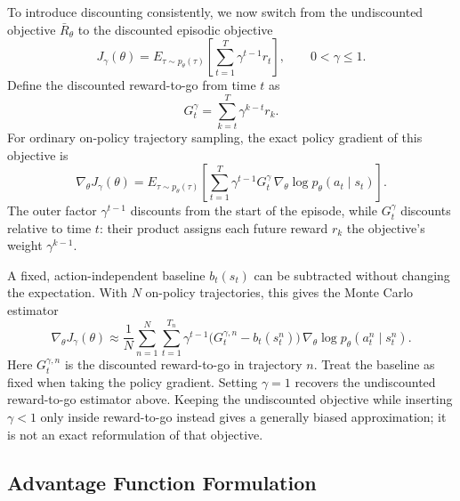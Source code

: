 \documentclass[11pt, a4paper]{article}
\begin{document}
To introduce discounting consistently, we now switch from the undiscounted objective $\bar{R}_\theta$ to the discounted episodic objective
\begin{equation}\label{eq:pg-discounted-objective}
    J_\gamma(\theta) = E_{\tau \sim p_\theta(\tau)}\left[\sum_{t=1}^{T} \gamma^{t-1} r_t\right], \qquad 0 < \gamma \le 1.
\end{equation}
Define the discounted reward-to-go from time $t$ as
\begin{equation}\label{eq:pg-discounted-return}
    G_t^\gamma = \sum_{k=t}^{T} \gamma^{k-t} r_k.
\end{equation}
For ordinary on-policy trajectory sampling, the exact policy gradient of this objective is
\begin{equation}\label{eq:pg-discounted-gradient}
    \nabla_\theta J_\gamma(\theta) = E_{\tau \sim p_\theta(\tau)}\left[\sum_{t=1}^{T} \gamma^{t-1} G_t^\gamma \, \nabla_\theta \log p_\theta(a_t \mid s_t)\right].
\end{equation}
The outer factor $\gamma^{t-1}$ discounts from the start of the episode, while $G_t^\gamma$ discounts relative to time $t$: their product assigns each future reward $r_k$ the objective's weight $\gamma^{k-1}$.

A fixed, action-independent baseline $b_t(s_t)$ can be subtracted without changing the expectation. With $N$ on-policy trajectories, this gives the Monte Carlo estimator
\begin{equation}\label{eq:pg-discounted-monte-carlo-gradient}
    \nabla_\theta J_\gamma(\theta) \approx \frac{1}{N} \sum_{n=1}^{N} \sum_{t=1}^{T_n} \gamma^{t-1} \big(G_t^{\gamma,n} - b_t(s_t^n)\big) \, \nabla_\theta \log p_\theta(a_t^n \mid s_t^n).
\end{equation}
Here $G_t^{\gamma,n}$ is the discounted reward-to-go in trajectory $n$. Treat the baseline as fixed when taking the policy gradient. Setting $\gamma=1$ recovers the undiscounted reward-to-go estimator above. Keeping the undiscounted objective while inserting $\gamma<1$ only inside reward-to-go instead gives a generally biased approximation; it is not an exact reformulation of that objective.

\subsection*{Advantage Function Formulation}
\end{document}
